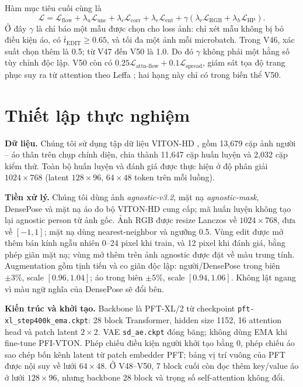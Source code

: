 \documentclass[11pt,a4paper]{article}
\newcommand{\Loss}{\mathcal{L}}
\begin{document}
Hàm mục tiêu cuối cùng là
\begin{equation}
\Loss= \Loss_{\mathrm{flow}} +\lambda_u\Loss_{\mathrm{unc}} +\lambda_c\Loss_{\mathrm{corr}} +\lambda_e\Loss_{\mathrm{ent}} +\gamma\left( \lambda_r\Loss_{\mathrm{RGB}} +\lambda_h\Loss_{\mathrm{HP}} \right).
\label{eq:objective}
\end{equation}
Ở đây \(\gamma\) là chỉ báo một mẫu được chọn cho loss ảnh: chỉ xét mẫu không bị bỏ điều kiện áo, có \(\bar t_{\mathrm{EDIT}}\geq0.65\), và tối đa một ảnh mỗi microbatch. Trong V46, xác suất chọn thêm là 0.5; từ V47 đến V50 là 1.0. Do đó \(\gamma\) không phải một hằng số tùy chỉnh độc lập. V50 còn có \(0.25\Loss_{\mathrm{attn\text{-}flow}}+0.1\Loss_{\mathrm{spread}}\), giám sát tọa độ trang phục suy ra từ attention theo Leffa \cite{leffa}; hai hạng này chỉ có trong biến thể V50.

\section{Thiết lập thực nghiệm}

\textbf{Dữ liệu.} Chúng tôi sử dụng tập dữ liệu VITON-HD \cite{vitonhd}, gồm 13{,}679 cặp ảnh người -- áo thân trên chụp chính diện, chia thành 11{,}647 cặp huấn luyện và 2{,}032 cặp kiểm thử. Toàn bộ huấn luyện và đánh giá được thực hiện ở độ phân giải \(1024\times768\) (latent \(128\times96\), \(64\times48\) token trên mỗi luồng).

\textbf{Tiền xử lý.} Chúng tôi dùng ảnh \textit{agnostic-v3.2}, mặt nạ \textit{agnostic-mask}, DensePose và mặt nạ áo do bộ VITON-HD cung cấp; mã huấn luyện không tạo lại agnostic person từ ảnh gốc. Ảnh RGB được resize Lanczos về \(1024\times768\), đưa về \([-1,1]\); mặt nạ dùng nearest-neighbor và ngưỡng 0.5. Vùng edit được mở thêm bán kính ngẫu nhiên 0--24 pixel khi train, và 12 pixel khi đánh giá, bằng phép giãn mặt nạ; vùng mở thêm trên ảnh agnostic được đặt về màu trung tính. Augmentation gồm tịnh tiến và co giãn độc lập: người/DensePose trong biên \(\pm3\%\), scale \([0.96,1.04]\); áo trong biên \(\pm5\%\), scale \([0.94,1.06]\). Không lật ngang vì màu ngữ nghĩa của DensePose sẽ đổi bên.

\textbf{Kiến trúc và khởi tạo.} Backbone là PFT-XL/2 \cite{pf} từ checkpoint \texttt{pft-xl\_step400k\_ema.ckpt}: 28 block Transformer, hidden size 1152, 16 attention head và patch latent \(2\times2\). VAE \texttt{sd\_ae.ckpt} đóng băng; không dùng EMA khi fine-tune PFI-VTON. Phép chiếu điều kiện người khởi tạo bằng 0, phép chiếu áo sao chép bốn kênh latent từ patch embedder PFT; bảng vị trí vuông của PFT được nội suy về lưới \(64\times48\). Ở V48--V50, 7 block cuối còn đọc thêm key/value áo ở lưới \(128\times96\), nhưng backbone 28 block và trọng số self-attention không đổi.
\end{document}
